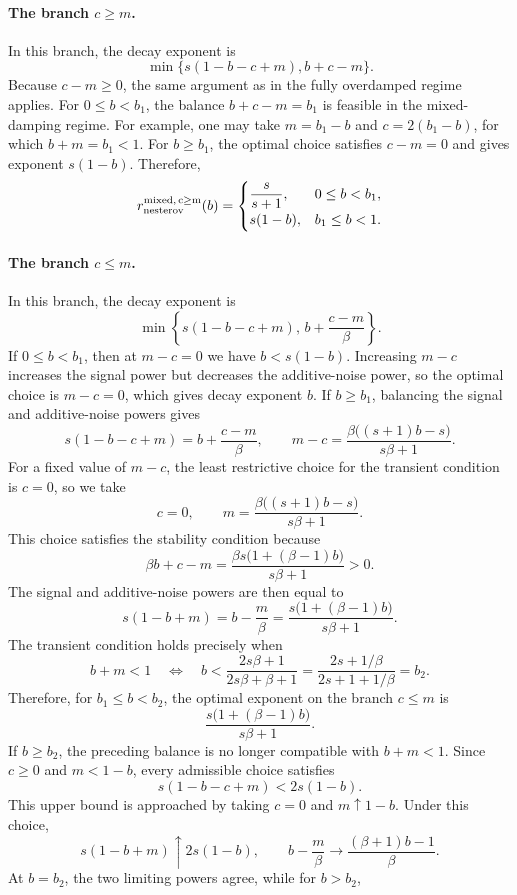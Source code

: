 \documentclass[11pt]{article}
\newcommand{\nesterov}{\mathrm{nesterov}}
\begin{document}
\paragraph{The branch $c\ge m$.} In this branch, the decay exponent is
\[
\min\{s(1-b-c+m),b+c-m\}.
\]
Because $c-m\ge0$, the same argument as in the fully overdamped regime applies. For $0\le b<b_1$, the balance $b+c-m=b_1$ is feasible in the mixed-damping regime. For example, one may take $m=b_1-b$ and $c=2(b_1-b)$, for which $b+m=b_1<1$. For $b\ge b_1$, the optimal choice satisfies $c-m=0$ and gives exponent $s(1-b)$. Therefore,
\[
r_{\nesterov}^{\rm mixed,\,c\ge m}(b)=
\begin{cases}
\dfrac{s}{s+1},&0\le b<b_1,\\[4pt]
s(1-b),&b_1\le b<1.
\end{cases}
\]
\paragraph{The branch $c\le m$.} In this branch, the decay exponent is
\[
\min\left\{s(1-b-c+m),\,b+\frac{c-m}{\beta}\right\}.
\]
If $0\le b<b_1$, then at $m-c=0$ we have $b<s(1-b)$. Increasing $m-c$ increases the signal power but decreases the additive-noise power, so the optimal choice is $m-c=0$, which gives decay exponent $b$.
If $b\ge b_1$, balancing the signal and additive-noise powers gives
\[
s(1-b-c+m)=b+\frac{c-m}{\beta},
\qquad
m-c=\frac{\beta\bigl((s+1)b-s\bigr)}{s\beta+1}.
\]
For a fixed value of $m-c$, the least restrictive choice for the transient condition is $c=0$, so we take
\[
c=0,\qquad m=\frac{\beta\bigl((s+1)b-s\bigr)}{s\beta+1}.
\]
This choice satisfies the stability condition because
\[
\beta b+c-m=\frac{\beta s\bigl(1+(\beta-1)b\bigr)}{s\beta+1}>0.
\]
The signal and additive-noise powers are then equal to
\[
s(1-b+m)=b-\frac{m}{\beta}=\frac{s\bigl(1+(\beta-1)b\bigr)}{s\beta+1}.
\]
The transient condition holds precisely when
\[
b+m<1
\quad\Longleftrightarrow\quad
b<\frac{2s\beta+1}{2s\beta+\beta+1}
=\frac{2s+1/\beta}{2s+1+1/\beta}
=b_2.
\]
Therefore, for $b_1\le b<b_2$, the optimal exponent on the branch $c\le m$ is
\[
\frac{s\bigl(1+(\beta-1)b\bigr)}{s\beta+1}.
\]
If $b\ge b_2$, the preceding balance is no longer compatible with $b+m<1$. Since $c\ge0$ and $m<1-b$, every admissible choice satisfies
\[
s(1-b-c+m)<2s(1-b).
\]
This upper bound is approached by taking $c=0$ and $m\uparrow1-b$. Under this choice,
\[
s(1-b+m)\uparrow2s(1-b),\qquad b-\frac{m}{\beta}\to\frac{(\beta+1)b-1}{\beta}.
\]
At $b=b_2$, the two limiting powers agree, while for $b>b_2$,
\end{document}
